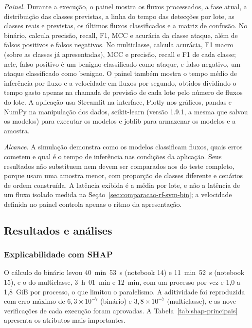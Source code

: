 \documentclass[
    12pt,                %
    openright,           %
    oneside,             %
    a4paper,             %
    english,             %
    brazil               %
]{abntex2}
\begin{document}
\textit{Painel.} Durante a execução, o painel mostra os fluxos processados, a fase atual, a distribuição das classes previstas, a linha do tempo das detecções por lote, as classes reais e previstas, os últimos fluxos classificados e a matriz de confusão. No binário, calcula precisão, recall, F1, MCC e acurácia da classe ataque, além de falsos positivos e falsos negativos. No multiclasse, calcula acurácia, F1 macro (sobre as classes já apresentadas), MCC e precisão, recall e F1 de cada classe; nele, falso positivo é um benigno classificado como ataque, e falso negativo, um ataque classificado como benigno. O painel também mostra o tempo médio de inferência por fluxo e a velocidade em fluxos por segundo, obtidos dividindo o tempo gasto apenas na chamada de previsão de cada lote pelo número de fluxos do lote. A aplicação usa Streamlit na interface, Plotly nos gráficos, pandas e NumPy na manipulação dos dados, scikit-learn (versão 1.9.1, a mesma que salvou os modelos) para executar os modelos e joblib para armazenar os modelos e a amostra.

\textit{Alcance.} A simulação demonstra como os modelos classificam fluxos, quais erros cometem e qual é o tempo de inferência nas condições da aplicação. Seus resultados não substituem nem devem ser comparados aos do teste completo, porque usam uma amostra menor, com proporção de classes diferente e cenários de ordem construída. A latência exibida é a média por lote, e não a latência de um fluxo isolado medida na Seção~\ref{sec:comparacao-rf-svm-bin}; a velocidade definida no painel controla apenas o ritmo da apresentação.

\subsection{Resultados e análises}
\label{sec:resultados-analises}

\subsubsection{Explicabilidade com SHAP}

O cálculo do binário levou 40~min~53~s (notebook 14) e 11~min~52~s (notebook 15), e o do multiclasse, 3~h~01~min e 12~min, com um processo por vez e 1,0 a 1,8~GiB por processo, o que limitou o paralelismo. A aditividade foi reproduzida com erro máximo de $6{,}3\times10^{-7}$ (binário) e $3{,}8\times10^{-7}$ (multiclasse), e as nove verificações de cada execução foram aprovadas. A Tabela~\ref{tab:shap-principais} apresenta os atributos mais importantes.
\end{document}
